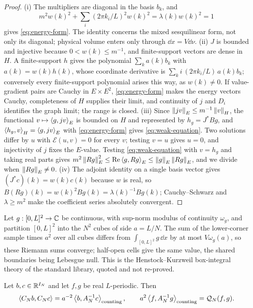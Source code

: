\begin{proof}
(i) The multipliers are diagonal in the basis $b_k$, and
\[
  m^2w(k)^2+\sum_i(2\pi k_i/L)^2w(k)^2=\lambda(k)w(k)^2=1
\]
gives
\eqref{eq:energy-form}. The identity concerns the mixed sesquilinear form, not
only its diagonal; physical volume enters only through $\dd x=V\dd\nu$.
(ii) $J$ is bounded and injective because $0<w(k)\le m^{-1}$, and
finite-support vectors are dense in $H$. A finite-support $h$ gives the
polynomial $\sum_ka(k)b_k$ with $a(k)=w(k)h(k)$, whose coordinate derivative is
$\sum_ki\,(2\pi k_i/L)\,a(k)b_k$; conversely every finite-support polynomial
arises this way, as $w(k)\ne0$. If value-gradient pairs are Cauchy in
$E\times E^2$, \eqref{eq:energy-form} makes the energy vectors Cauchy,
completeness of $H$ supplies their limit, and continuity of $j$ and $D_i$
identifies the graph limit; the range is closed.
(iii) Since $\left\| jv \right\|_E\le m^{-1}\left\| v \right\|_H$, the functional
$v\mapsto\left\langle g, jv \right\rangle_E$ is bounded on $H$ and represented by $h_g=J^*Bg$, and
$\left\langle h_g, v \right\rangle_H=\left\langle g, jv \right\rangle_E$ with \eqref{eq:energy-form} gives
\eqref{eq:weak-equation}. Two solutions differ by $u$ with
$\mathcal E(u,v)=0$ for every $v$; testing $v=u$ gives $u=0$, and injectivity of
$j$ fixes the $E$-value. Testing \eqref{eq:weak-equation} with $v=h_g$ and
taking real parts gives
$m^2\left\| Rg \right\|_E^2\le\operatorname{Re}\left\langle g, Rg \right\rangle_E\le\left\| g \right\|_E\left\| Rg \right\|_E$, and we divide
when $\left\| Rg \right\|_E\ne0$.
(iv) The adjoint identity on a single basis vector gives $(J^*c)(k)=w(k)c(k)$
because $w$ is real, so $B(Rg)(k)=w(k)^2Bg(k)=\lambda(k)^{-1}Bg(k)$;
Cauchy--Schwarz and $\lambda\ge m^2$ make the coefficient series absolutely
convergent.
\end{proof}

\begin{external}\label{ext:boxintegral}
Let $g:[0,L]^2\to\mathbb{C}$ be continuous, with sup-norm modulus of continuity
$\omega_g$, and partition $[0,L]^2$ into the $N^2$ cubes of side $a=L/N$. The
sum of the lower-corner sample times $a^2$ over all cubes differs from
$\int_{[0,L]^2}g\,\dd x$ by at most $V\omega_g(a)$, so these Riemann sums
converge; half-open cells give the same value, the shared boundaries being
Lebesgue null. This is the Henstock--Kurzweil box-integral theory of the
standard library, quoted and not re-proved.
\end{external}

\begin{lemma}\label{lem:resolvent-pairing}
Let $b,c\in\mathbb{R}^{I_N}$ and let $f,g$ be real $L$-periodic. Then
\begin{equation}\label{eq:counting-pairing}
  \left\langle C_Nb, C_Nc \right\rangle=a^{-2}\left\langle b, A_N^{-1}c \right\rangle_{\mathrm{counting}},
  \qquad
  a^2\left\langle f, A_N^{-1}g \right\rangle_{\mathrm{counting}}=\mathcal Q_N(f,g).
\end{equation}
\end{lemma}

